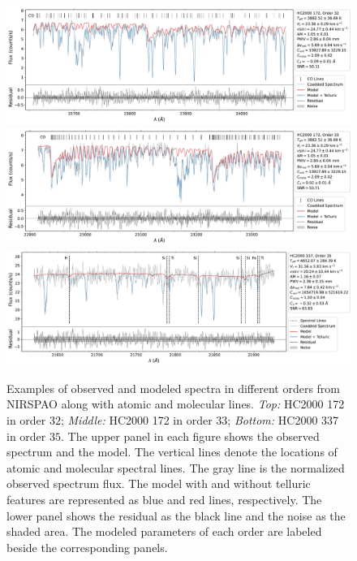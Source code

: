 \documentclass[12pt]{ucsddissertation}
\begin{document}
\begin{CJK*}{UTF8}{gbsn}
\begin{figure}[htb!]
    \centering
    \includegraphics[width=\linewidth]{figures/chapter1/spectrum_modeled_O32.pdf}
    \includegraphics[width=\linewidth]{figures/chapter1/spectrum_modeled_O33.pdf}
    \includegraphics[width=\linewidth]{figures/chapter1/spectrum_modeled_O35.pdf}
    \caption[Examples of observed and modeled NIRSPAO spectra]{Examples of observed and modeled spectra in different orders from NIRSPAO along with atomic and molecular lines. \textit{Top:} HC2000 172 in order $32$; \textit{Middle:} HC2000 172 in order $33$; \textit{Bottom:} HC2000 337 in order $35$. The upper panel in each figure shows the observed spectrum and the model. The vertical lines denote the locations of atomic and molecular spectral lines. The gray line is the normalized observed spectrum flux. The model with and without telluric features are represented as blue and red lines, respectively. The lower panel shows the residual as the black line and the noise as the shaded area. The modeled parameters of each order are labeled beside the corresponding panels. \label{fig:spectrum}}
\end{figure}



\end{CJK*}
\end{document}

